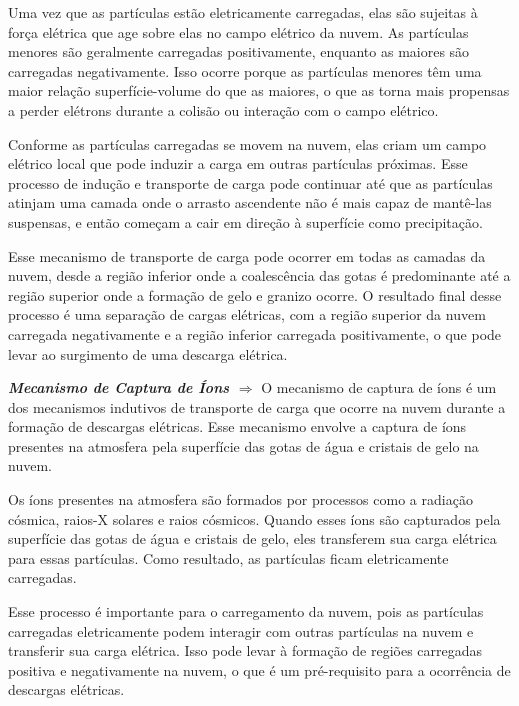 \documentclass[a4paper, 12pt, onecolumn,singlespacing]{article}
\begin{document}
\begin{itemize}
		Uma vez que as partículas estão eletricamente carregadas, elas são sujeitas à força elétrica que age sobre elas no campo elétrico da nuvem. As partículas menores são geralmente carregadas positivamente, enquanto as maiores são carregadas negativamente. Isso ocorre porque as partículas menores têm uma maior relação superfície-volume do que as maiores, o que as torna mais propensas a perder elétrons durante a colisão ou interação com o campo elétrico.
		
		Conforme as partículas carregadas se movem na nuvem, elas criam um campo elétrico local que pode induzir a carga em outras partículas próximas. Esse processo de indução e transporte de carga pode continuar até que as partículas atinjam uma camada onde o arrasto ascendente não é mais capaz de mantê-las suspensas, e então começam a cair em direção à superfície como precipitação.
		
		Esse mecanismo de transporte de carga pode ocorrer em todas as camadas da nuvem, desde a região inferior onde a coalescência das gotas é predominante até a região superior onde a formação de gelo e granizo ocorre. O resultado final desse processo é uma separação de cargas elétricas, com a região superior da nuvem carregada negativamente e a região inferior carregada positivamente, o que pode levar ao surgimento de uma descarga elétrica.
		
		\subitem \textbf{\textit{Mecanismo de Captura de Íons $\Rightarrow$ }}O mecanismo de captura de íons é um dos mecanismos indutivos de transporte de carga que ocorre na nuvem durante a formação de descargas elétricas. Esse mecanismo envolve a captura de íons presentes na atmosfera pela superfície das gotas de água e cristais de gelo na nuvem.
		
		Os íons presentes na atmosfera são formados por processos como a radiação cósmica, raios-X solares e raios cósmicos. Quando esses íons são capturados pela superfície das gotas de água e cristais de gelo, eles transferem sua carga elétrica para essas partículas. Como resultado, as partículas ficam eletricamente carregadas.
		
		Esse processo é importante para o carregamento da nuvem, pois as partículas carregadas eletricamente podem interagir com outras partículas na nuvem e transferir sua carga elétrica. Isso pode levar à formação de regiões carregadas positiva e negativamente na nuvem, o que é um pré-requisito para a ocorrência de descargas elétricas.
	
	\end{itemize}
	
\end{document}
